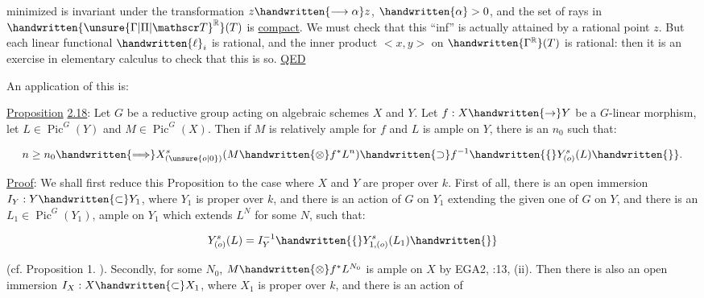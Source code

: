 
minimized is invariant under the transformation $z\handwritten{\longrightarrow\alpha}z$, $\handwritten{\alpha}>0$, and the set of rays in $\handwritten{\unsure{\Gamma|\Pi|\mathscr T}^{\mathbb R}}(T)$ is \uline{compact}. We must check that this ``inf'' is actually attained by a rational point $z$. But each linear functional $\handwritten{\ell}_i$ is rational, and the inner product $<x,y>$ on $\handwritten{\Gamma^{\mathbb R}}(T)$ is rational: then it is an exercise in elementary calculus to check that this is so. \uline{QED}

An application of this is:

\uline{Proposition} \uline{2.18}: Let $G$ be a reductive group acting on algebraic schemes $X$ and $Y$. Let $f:X\handwritten{\to}Y$ be a $G$-linear morphism, let $L\in\operatorname{Pic}^G(Y)$ and $M\in\operatorname{Pic}^G(X)$. Then if $M$ is relatively ample for $f$ and $L$ is ample on $Y$, there is an $n_0$ such that:

\[
n\geq n_0\handwritten{\Longrightarrow}X^s_{(\unsure{o|0})}(M\handwritten{\otimes}f^*L^n)\handwritten{\supset} f^{-1}\handwritten{\{}Y^s_{(o)}(L)\handwritten{\}}.
\]

\uline{Proof}: We shall first reduce this Proposition to the case where $X$ and $Y$ are proper over $k$. First of all, there is an open immersion $I_Y:Y\handwritten{\subset}Y_1$, where $Y_1$ is proper over $k$, and there is an action of $G$ on $Y_1$ extending the given one of $G$ on $Y$, and there is an $L_1\in\operatorname{Pic}^G(Y_1)$, ample on $Y_1$ which extends $L^N$ for some $N$, such that:

\[
Y^s_{(o)}(L)=I_Y^{-1}\handwritten{\{}Y^s_{1,(o)}(L_1)\handwritten{\}}
\]

(cf. Proposition 1. ). Secondly, for some $N_0$, $M\handwritten{\otimes}f^*L^{N_0}$ is ample on $X$ by EGA2, :13, (ii). Then there is also an open immersion $I_X:X\handwritten{\subset}X_1$, where $X_1$ is proper over $k$, and there is an action of

